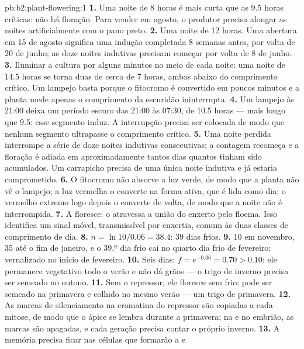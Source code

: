 \begin{solution}{pb:b2:plant-flowering:1}
\textbf{1.} Uma noite de 8 horas é mais curta que as 9.5 horas críticas:
não há floração. Para vender em agosto, o produtor precisa alongar as
noites artificialmente com o pano preto.
\textbf{2.} Uma noite de 12 horas. Uma abertura em 15 de agosto
significa uma indução completada 8 semanas antes, por volta de 20 de
junho; as doze noites indutivas precisam começar por volta de 8 de
junho.
\textbf{3.} Iluminar a cultura por alguns minutos no meio de cada
noite: uma noite de 14.5 horas se torna duas de cerca de 7 horas, ambas
abaixo do comprimento crítico. Um lampejo basta porque o fitocromo é
convertido em poucos minutos e a planta mede apenas o comprimento da
escuridão ininterrupta.
\textbf{4.} Um lampejo às 21:00 deixa um período escuro das
21:00 às 07:30, de 10.5 horas --- mais longo que 9.5:
esse segmento induz. A interrupção precisa ser colocada de modo que
nenhum segmento ultrapasse o comprimento crítico.
\textbf{5.} Uma noite perdida interrompe a série de doze noites
indutivas consecutivas: a contagem recomeça e a floração é adiada em
aproximadamente tantos dias quantos tinham sido acumulados. Um
carrapicho precisa de uma única noite indutiva e já estaria
comprometido.
\textbf{6.} O fitocromo não absorve a luz verde, de modo que a planta
não vê o lampejo; a luz vermelha o converte na forma ativa, que é lida
como dia; o vermelho extremo logo depois o converte de volta, de modo
que a noite não é interrompida.
\textbf{7.} A  floresce: o  atravessa a
união do enxerto pelo floema. Isso identifica um sinal móvel,
transmissível por enxertia, comum às duas classes de comprimento de
dia.
\textbf{8.} $n = \ln 10/0.06 = 38.4$: 39 dias frios.
\textbf{9.} 10 em novembro, 35 até o fim de janeiro, e o 39.º dia frio
cai no quarto dia frio de fevereiro: vernalizado no início de
fevereiro.
\textbf{10.} Seis dias: $f = e^{-0.36} = 0.70 > 0.10$: ele permanece
vegetativo todo o verão e não dá grãos --- o trigo de inverno precisa
ser semeado no outono.
\textbf{11.} Sem o repressor, ele floresce sem frio: pode ser semeado na
primavera e colhido no mesmo verão --- um trigo de primavera.
\textbf{12.} As marcas de silenciamento na cromatina do repressor são
copiadas a cada mitose, de modo que o ápice se lembra durante a
primavera; na  e no embrião, as marcas são apagadas, e cada
geração precisa contar o próprio inverno.
\textbf{13.} A memória precisa ficar nas células que formarão a  e

\end{solution}
